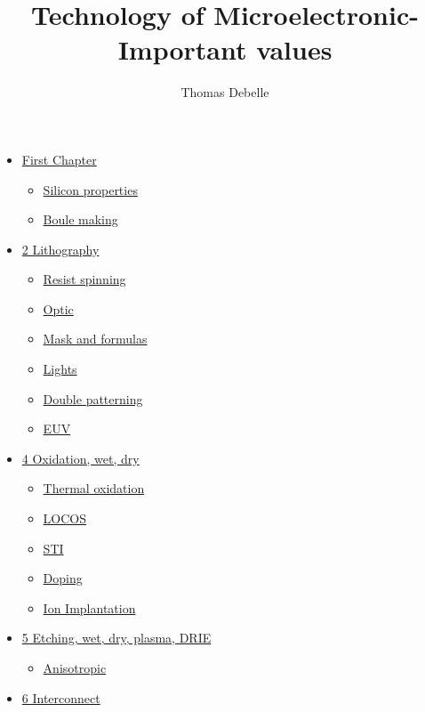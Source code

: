 \documentclass[
]{article}
\title{Technology of Microelectronic- Important values}
\author{Thomas Debelle}
\date{}
\providecommand{\tightlist}{%
  \setlength{\itemsep}{0pt}\setlength{\parskip}{0pt}}
\begin{document}
\maketitle

\begin{itemize}
\tightlist
\item
  \hyperref[first-chapter]{First Chapter}

  \begin{itemize}
  \tightlist
  \item
    \hyperref[silicon-properties]{Silicon properties}
  \item
    \hyperref[boule-making]{Boule making}
  \end{itemize}
\item
  \hyperref[2-lithography]{2 Lithography}

  \begin{itemize}
  \tightlist
  \item
    \hyperref[resist-spinning]{Resist spinning}
  \item
    \hyperref[optic]{Optic}
  \item
    \hyperref[mask-and-formulas]{Mask and formulas}
  \item
    \hyperref[lights]{Lights}
  \item
    \hyperref[double-patterning]{Double patterning}
  \item
    \hyperref[euv]{EUV}
  \end{itemize}
\item
  \hyperref[4-oxidation-wet-dry]{4 Oxidation, wet, dry}

  \begin{itemize}
  \tightlist
  \item
    \hyperref[thermal-oxidation]{Thermal oxidation}
  \item
    \hyperref[locos]{LOCOS}
  \item
    \hyperref[sti]{STI}
  \item
    \hyperref[doping]{Doping}
  \item
    \hyperref[ion-implantation]{Ion Implantation}
  \end{itemize}
\item
  \hyperref[5-etching-wet-dry-plasma-drie]{5 Etching, wet, dry, plasma,
  DRIE}

  \begin{itemize}
  \tightlist
  \item
    \hyperref[anisotropic]{Anisotropic}
  \end{itemize}
\item
  \hyperref[6-interconnect]{6 Interconnect}


\end{itemize}
\end{document}

